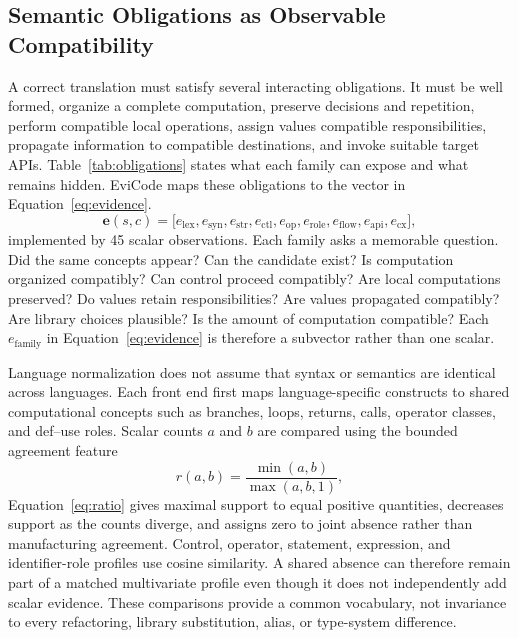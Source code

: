 \documentclass[conference]{IEEEtran}
\begin{document}
\subsection{Semantic Obligations as Observable Compatibility}
A correct translation must satisfy several interacting obligations. It must be well formed, organize a complete computation, preserve decisions and repetition, perform compatible local operations, assign values compatible responsibilities, propagate information to compatible destinations, and invoke suitable target APIs. Table~\ref{tab:obligations} states what each family can expose and what remains hidden. EviCode maps these obligations to the vector in Equation~\ref{eq:evidence}.
\begin{equation}
\boldsymbol{e}(s,c)=\big[e_{\mathrm{lex}},e_{\mathrm{syn}},e_{\mathrm{str}},e_{\mathrm{ctl}},e_{\mathrm{op}},e_{\mathrm{role}},e_{\mathrm{flow}},e_{\mathrm{api}},e_{\mathrm{cx}}\big],
\label{eq:evidence}
\end{equation}
implemented by 45 scalar observations. Each family asks a memorable question. Did the same concepts appear? Can the candidate exist? Is computation organized compatibly? Can control proceed compatibly? Are local computations preserved? Do values retain responsibilities? Are values propagated compatibly? Are library choices plausible? Is the amount of computation compatible?
Each $e_{\mathrm{family}}$ in Equation~\ref{eq:evidence} is therefore a subvector rather than one scalar.

Language normalization does not assume that syntax or semantics are identical across languages. Each front end first maps language-specific constructs to shared computational concepts such as branches, loops, returns, calls, operator classes, and def--use roles. Scalar counts $a$ and $b$ are compared using the bounded agreement feature
\begin{equation}
r(a,b)=\frac{\min(a,b)}{\max(a,b,1)},
\label{eq:ratio}
\end{equation}
Equation~\ref{eq:ratio} gives maximal support to equal positive quantities, decreases support as the counts diverge, and assigns zero to joint absence rather than manufacturing agreement. Control, operator, statement, expression, and identifier-role profiles use cosine similarity. A shared absence can therefore remain part of a matched multivariate profile even though it does not independently add scalar evidence. These comparisons provide a common vocabulary, not invariance to every refactoring, library substitution, alias, or type-system difference.
\end{document}
